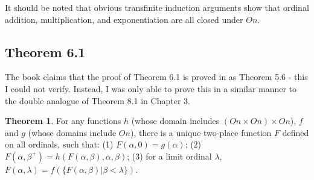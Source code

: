 \documentclass{article}
\theoremstyle{definition}
\newtheorem{theorem}{Theorem}[section]
\begin{document}
It should be noted that obvious transfinite induction arguments show that ordinal addition, multiplication, and exponentiation are all closed under $On$.

\subsection*{Theorem 6.1}
The book claims that the proof of Theorem 6.1 is proved in  as Theorem 5.6 - this I could not verify. Instead, I was only 
able to prove this in a similar manner to the double analogue of Theorem 8.1 in Chapter 3.

\begin{theorem}
For any functions $h$ (whose domain includes $(On\times On)\times On$), $f$ and $g$ (whose domains include $On$), there is a unique two-place function $F$ defined on all ordinals, 
such that:\newline
(1) $F(\alpha,0)=g(\alpha)$;\newline
(2) $F(\alpha,\beta^+)=h(F(\alpha,\beta),\alpha,\beta)$;\newline
(3) for a limit ordinal $\lambda$, $F(\alpha,\lambda)=f(\{F(\alpha,\beta)|\beta<\lambda\})$.
\end{theorem}
\end{document}
